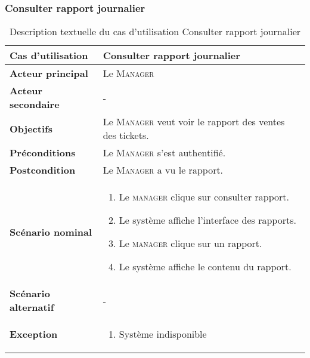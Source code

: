         \subsubsection[Consulter rapport journalier]{Consulter rapport journalier}
        \begin{longtable}{p{4cm} p{9cm}}
            \caption{Description textuelle du cas d’utilisation Consulter rapport journalier}
            \label{table:usecaseConsulterRapportJ}
            \\\hline\hline
                \textbf{Cas d’utilisation} & \textbf{Consulter rapport journalier}
            \\\hline\hline
                    \textbf{Acteur principal} & Le \textsc{Manager}
                \\
                    \textbf{Acteur secondaire} & -
                \\
                    \textbf{Objectifs} & Le \textsc{Manager} veut voir le rapport des ventes
                    des tickets.
                \\
                    \textbf{Préconditions} & Le \textsc{Manager} s’est authentifié.
                \\
                    \textbf{Postcondition} & Le \textsc{Manager} a vu le rapport.
                \\
                \textbf{Scénario nominal} &
                    \begin{enumerate}[leftmargin=*]
                        \item Le \textsc{manager} clique sur consulter rapport.
                        \item Le système affiche l’interface des rapports.
                        \item Le \textsc{manager} clique sur un rapport.
                        \item Le système affiche le contenu du rapport.
                    \end{enumerate}
                \\
                \textbf{Scénario alternatif} & -
                \\
                \textbf{Exception} &
                    \begin{enumerate}[leftmargin=*]
                        \item Système indisponible
                    \end{enumerate}
            \\\bottomrule
        \end{longtable}
\pagebreak
